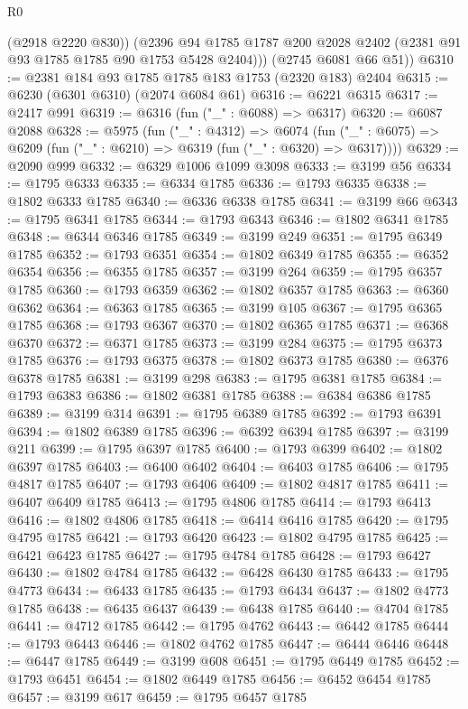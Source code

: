 \begin{lexlean}{R0}
\begin{coremodule}
          (@2918 @2220 @830))
        (@2396 @94 @1785 @1787 @200 @2028 @2402 (@2381 @91 @93 @1785 @1785 @90 @1753 @5428 @2404)))
      (@2745 @6081 @66 @51))
@6310 := @2381 @184 @93 @1785 @1785 @183 @1753 (@2320 @183) @2404
@6315 := @6230 (@6301 @6310) (@2074 @6084 @61)
@6316 := @6221 @6315
@6317 := @2417 @991
@6319 := @6316 (fun ("_" : @6088) => @6317)
@6320 := @6087 @2088
@6328 := @5975
    (fun ("_" : @4312) =>
    @6074 (fun ("_" : @6075) => @6209 (fun ("_" : @6210) => @6319 (fun ("_" : @6320) => @6317))))
@6329 := @2090 @999
@6332 := @6329 @1006 @1099 @3098
@6333 := @3199 @56
@6334 := @1795 @6333
@6335 := @6334 @1785
@6336 := @1793 @6335
@6338 := @1802 @6333 @1785
@6340 := @6336 @6338 @1785
@6341 := @3199 @66
@6343 := @1795 @6341 @1785
@6344 := @1793 @6343
@6346 := @1802 @6341 @1785
@6348 := @6344 @6346 @1785
@6349 := @3199 @249
@6351 := @1795 @6349 @1785
@6352 := @1793 @6351
@6354 := @1802 @6349 @1785
@6355 := @6352 @6354
@6356 := @6355 @1785
@6357 := @3199 @264
@6359 := @1795 @6357 @1785
@6360 := @1793 @6359
@6362 := @1802 @6357 @1785
@6363 := @6360 @6362
@6364 := @6363 @1785
@6365 := @3199 @105
@6367 := @1795 @6365 @1785
@6368 := @1793 @6367
@6370 := @1802 @6365 @1785
@6371 := @6368 @6370
@6372 := @6371 @1785
@6373 := @3199 @284
@6375 := @1795 @6373 @1785
@6376 := @1793 @6375
@6378 := @1802 @6373 @1785
@6380 := @6376 @6378 @1785
@6381 := @3199 @298
@6383 := @1795 @6381 @1785
@6384 := @1793 @6383
@6386 := @1802 @6381 @1785
@6388 := @6384 @6386 @1785
@6389 := @3199 @314
@6391 := @1795 @6389 @1785
@6392 := @1793 @6391
@6394 := @1802 @6389 @1785
@6396 := @6392 @6394 @1785
@6397 := @3199 @211
@6399 := @1795 @6397 @1785
@6400 := @1793 @6399
@6402 := @1802 @6397 @1785
@6403 := @6400 @6402
@6404 := @6403 @1785
@6406 := @1795 @4817 @1785
@6407 := @1793 @6406
@6409 := @1802 @4817 @1785
@6411 := @6407 @6409 @1785
@6413 := @1795 @4806 @1785
@6414 := @1793 @6413
@6416 := @1802 @4806 @1785
@6418 := @6414 @6416 @1785
@6420 := @1795 @4795 @1785
@6421 := @1793 @6420
@6423 := @1802 @4795 @1785
@6425 := @6421 @6423 @1785
@6427 := @1795 @4784 @1785
@6428 := @1793 @6427
@6430 := @1802 @4784 @1785
@6432 := @6428 @6430 @1785
@6433 := @1795 @4773
@6434 := @6433 @1785
@6435 := @1793 @6434
@6437 := @1802 @4773 @1785
@6438 := @6435 @6437
@6439 := @6438 @1785
@6440 := @4704 @1785
@6441 := @4712 @1785
@6442 := @1795 @4762
@6443 := @6442 @1785
@6444 := @1793 @6443
@6446 := @1802 @4762 @1785
@6447 := @6444 @6446
@6448 := @6447 @1785
@6449 := @3199 @608
@6451 := @1795 @6449 @1785
@6452 := @1793 @6451
@6454 := @1802 @6449 @1785
@6456 := @6452 @6454 @1785
@6457 := @3199 @617
@6459 := @1795 @6457 @1785

\end{coremodule}
\end{lexlean}
